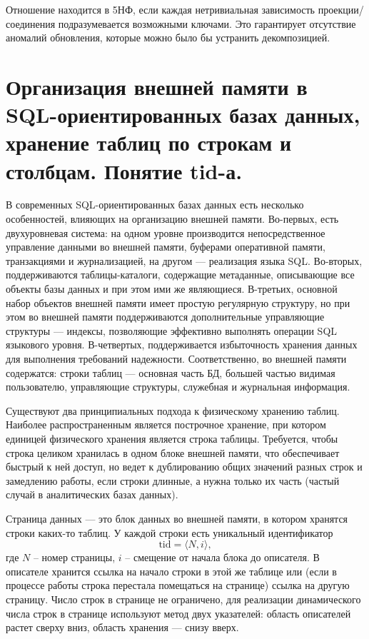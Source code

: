 \documentclass[a4paper,12pt]{article}
\begin{document}
Отношение находится в 5НФ, если каждая нетривиальная зависимость проекции/соединения подразумевается возможными ключами. Это гарантирует отсутствие аномалий обновления, которые можно было бы устранить декомпозицией.



\section{Организация внешней памяти в SQL-ориентированных базах данных, хранение таблиц по строкам и столбцам. Понятие tid-а.}
В современных SQL-ориентированных базах данных есть несколько особенностей,
влияющих на организацию внешней памяти. Во-первых, есть двухуровневая система: на
одном уровне производится непосредственное управление данными во внешней памяти,
буферами оперативной памяти, транзакциями и журнализацией, на другом — реализация
языка SQL. Во-вторых, поддерживаются таблицы-каталоги, содержащие метаданные,
описывающие все объекты базы данных и при этом ими же являющиеся. В-третьих,
основной набор объектов внешней памяти имеет простую регулярную структуру, но при этом
во внешней памяти поддерживаются дополнительные управляющие структуры — индексы,
позволяющие эффективно выполнять операции SQL языкового уровня. В-четвертых,
поддерживается избыточность хранения данных для выполнения требований надежности.
Соответственно, во внешней памяти содержатся: строки таблиц — основная часть БД,
большей частью видимая пользователю, управляющие структуры, служебная и журнальная
информация.

Существуют два принципиальных подхода к физическому хранению таблиц.
Наиболее распространенным является построчное хранение, при котором единицей
физического хранения является строка таблицы. Требуется, чтобы строка целиком хранилась
в одном блоке внешней памяти, что обеспечивает быстрый к ней доступ, но ведет к
дублированию общих значений разных строк и замедлению работы, если строки длинные, а
нужна только их часть (частый случай в аналитических базах данных).

Страница данных — это блок данных во внешней памяти, в котором хранятся строки каких-то таблиц. У каждой строки есть уникальный идентификатор 
\[
\text{tid} = \langle N, i\rangle,
\] 
где $N$ – номер страницы, $i$ – смещение от начала блока до описателя. В описателе хранится ссылка на
начало строки в этой же таблице или (если в процессе работы строка перестала помещаться
на странице) ссылка на другую страницу. Число строк в странице не ограничено, для
реализации динамического числа строк в странице используют метод двух указателей:
область описателей растет сверху вниз, область хранения — снизу вверх.
\end{document}
